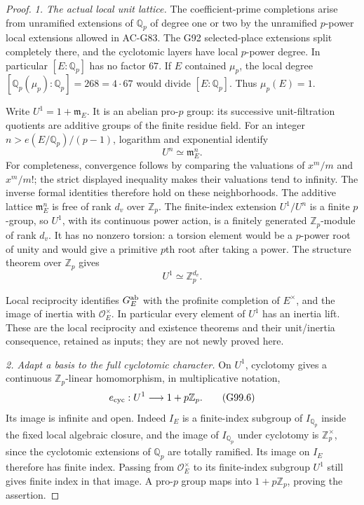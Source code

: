 \begin{proof}
\emph{1. The actual local unit lattice.}
The coefficient-prime completions arise from unramified extensions
of \(\mathbb Q_p\) of degree one or two by the unramified
\(p\)-power local extensions allowed in AC-G83.  The G92
selected-place extensions split completely there, and the cyclotomic
layers have local \(p\)-power degree.  In particular \([E:\mathbb Q_p]\) has
no factor \(67\).  If \(E\) contained \(\mu_p\), the local degree
\([\mathbb Q_p(\mu_p):\mathbb Q_p]=268=4\cdot67\) would divide
\([E:\mathbb Q_p]\).  Thus \(\mu_p(E)=1\).

Write \(U^1=1+\mathfrak m_E\).  It is an abelian pro-\(p\)
group: its successive unit-filtration quotients are additive
groups of the finite residue field.  For an integer
\(n>e(E/\mathbb Q_p)/(p-1)\), logarithm and exponential identify
\[
                       U^n\simeq\mathfrak m_E^n.     \tag{G99.4}
\]
For completeness, convergence follows by comparing the valuations
of \(x^m/m\) and \(x^m/m!\); the strict displayed inequality makes
their valuations tend to infinity.  The inverse formal identities
therefore hold on these neighborhoods.  The additive lattice
\(\mathfrak m_E^n\) is free of rank \(d_v\) over \(\mathbb Z_p\).
The finite-index extension \(U^1/U^n\) is a finite \(p\)-group,
so \(U^1\), with its continuous power action, is a finitely generated
\(\mathbb Z_p\)-module of rank \(d_v\).  It has no nonzero torsion:
a torsion element would be a \(p\)-power root of unity and would
give a primitive \(p\)th root after taking a power.  The structure
theorem over \(\mathbb Z_p\) gives
\[
                            U^1\simeq\mathbb Z_p^{d_v}. \tag{G99.5}
\]

Local reciprocity identifies \(G_E^{\rm ab}\) with the profinite
completion of \(E^\times\), and the image of inertia with
\(\mathcal O_E^\times\).  In particular every element of \(U^1\)
has an inertia lift.  These are the local reciprocity and existence
theorems and their unit/inertia consequence, retained as inputs;
they are not newly proved here.

\emph{2. Adapt a basis to the full cyclotomic character.}
On \(U^1\), cyclotomy gives a continuous \(\mathbb Z_p\)-linear
homomorphism, in multiplicative notation,
\[
                  e_{\rm cyc}:U^1\longrightarrow1+p\mathbb Z_p.
                                                               \tag{G99.6}
\]
Its image is infinite and open.  Indeed \(I_E\) is a finite-index
subgroup of \(I_{\mathbb Q_p}\) inside the fixed local algebraic
closure, and the image of \(I_{\mathbb Q_p}\) under cyclotomy is
\(\mathbb Z_p^\times\), since the cyclotomic extensions of
\(\mathbb Q_p\) are totally ramified.  Its image on \(I_E\)
therefore has finite index.  Passing from
\(\mathcal O_E^\times\) to its finite-index subgroup \(U^1\)
still gives finite index in that image.  A pro-\(p\) group maps
into \(1+p\mathbb Z_p\), proving the assertion.


\end{proof}
